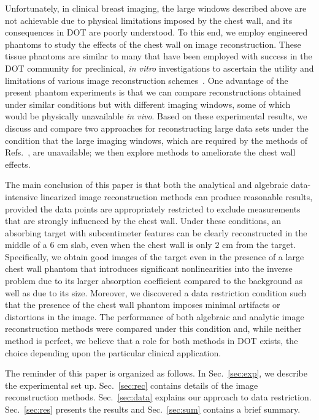 Unfortunately, in clinical breast imaging, the large windows described above are not achievable due to physical limitations imposed by the chest wall, and its consequences in DOT are poorly understood. To this end, we employ engineered phantoms to study the effects of the chest wall on image reconstruction.
These tissue phantoms are similar to many that have been employed with success in the DOT community for preclinical, {\em in vitro} investigations to ascertain the utility and limitations of various image reconstruction schemes~\cite{Pogue2006,Cerussi2012,culver_03_1}. One advantage of the present phantom experiments is that we can compare reconstructions obtained under similar conditions but with different imaging windows, some of which would be physically unavailable {\em in vivo}. Based on these experimental results, we discuss and compare two approaches for reconstructing large data sets under the condition that the large imaging windows, which are required by the methods of Refs.~\cite{markel_01_3,markel_02_2,markel_03_1,markel_03_2,markel_04_4}, are unavailable; we then explore methods to ameliorate the chest wall effects.

The main conclusion of this paper is that both the analytical and algebraic data-intensive linearized image reconstruction methods can produce reasonable results, provided the data points are appropriately restricted to exclude measurements that are strongly influenced by the chest wall. Under these conditions, an absorbing target with subcentimeter features can be clearly reconstructed in the middle of a $6$ cm slab, even when the chest wall is only $2$ cm from the target. Specifically, we obtain good images of the target even in the presence of a large chest wall phantom that introduces significant nonlinearities into the inverse problem due to its larger absorption coefficient compared to the background as well as due to its size. Moreover, we discovered a data restriction condition such that the presence of the chest wall phantom imposes minimal artifacts or distortions in the image. The performance of both algebraic and analytic image reconstruction methods were compared under this condition and, while
neither method is perfect, we believe that a role for both methods in DOT exists, the choice depending upon the particular clinical application.

The reminder of this paper is organized as follows. In Sec.~\ref{sec:exp}, we describe the experimental set up. Sec.~\ref{sec:rec} contains details of the image reconstruction methods. Sec.~\ref{sec:data} explains our approach to data restriction. Sec.~\ref{sec:res} presents the results and Sec.~\ref{sec:sum} contains a brief summary.

